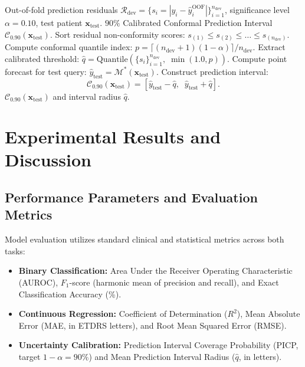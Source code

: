 \documentclass[preprint,12pt]{elsarticle}
\begin{document}
\begin{algorithm}[!t]
\caption{Distribution-Free Cross-Conformal Uncertainty Calibration}
\label{alg:conformal_calibration}
\begin{algorithmic}[1]
\REQUIRE Out-of-fold prediction residuals $\mathcal{R}_{\text{dev}} = \{s_i = |y_i - \hat{y}_i^{\text{OOF}}|\}_{i=1}^{n_{\text{dev}}}$, significance level $\alpha = 0.10$, test patient $\mathbf{x}_{\text{test}}$.
\ENSURE $90\%$ Calibrated Conformal Prediction Interval $\mathcal{C}_{0.90}(\mathbf{x}_{\text{test}})$.
\STATE Sort residual non-conformity scores: $s_{(1)} \le s_{(2)} \le \dots \le s_{(n_{\text{dev}})}$.
\STATE Compute conformal quantile index: $p = \lceil (n_{\text{dev}} + 1)(1 - \alpha) \rceil / n_{\text{dev}}$.
\STATE Extract calibrated threshold: $\hat{q} = \text{Quantile}\left(\{s_i\}_{i=1}^{n_{\text{dev}}}, \; \min(1.0, p)\right)$.
\STATE Compute point forecast for test query: $\hat{y}_{\text{test}} = \mathcal{M}^*(\mathbf{x}_{\text{test}})$.
\STATE Construct prediction interval:
\begin{equation}
\mathcal{C}_{0.90}(\mathbf{x}_{\text{test}}) = \left[ \hat{y}_{\text{test}} - \hat{q}, \;\; \hat{y}_{\text{test}} + \hat{q} \right].
\end{equation}
\RETURN $\mathcal{C}_{0.90}(\mathbf{x}_{\text{test}})$ and interval radius $\hat{q}$.
\end{algorithmic}
\end{algorithm}

\section{Experimental Results and Discussion}
\label{sec:results}

\subsection{Performance Parameters and Evaluation Metrics}
Model evaluation utilizes standard clinical and statistical metrics across both tasks:
\begin{itemize}
    \item \textbf{Binary Classification:} Area Under the Receiver Operating Characteristic (AUROC), $F_1$-score (harmonic mean of precision and recall), and Exact Classification Accuracy (\%).
    \item \textbf{Continuous Regression:} Coefficient of Determination ($R^2$), Mean Absolute Error (MAE, in ETDRS letters), and Root Mean Squared Error (RMSE).
    \item \textbf{Uncertainty Calibration:} Prediction Interval Coverage Probability (PICP, target $1-\alpha = 90\%$) and Mean Prediction Interval Radius ($\hat{q}$, in letters).
\end{itemize}
\end{document}
